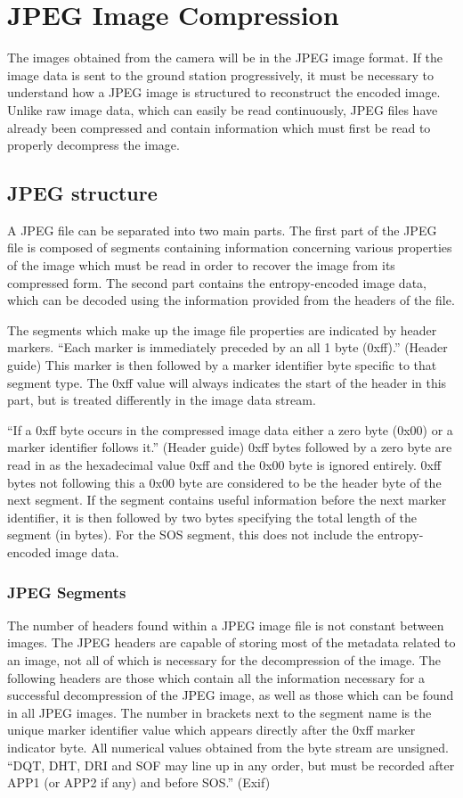 
\section{JPEG Image Compression}
The images obtained from the camera will be in the JPEG image format. 
If the image data is sent to the ground station progressively, 
it must be necessary to understand how a JPEG image is structured to reconstruct the encoded image. 
Unlike raw image data, which can easily be read continuously, 
JPEG files have already been compressed and contain information which must first be read to properly decompress the image.

\subsection{JPEG structure}
A JPEG file can be separated into two main parts. 
The first part of the JPEG file is composed of segments containing information concerning 
various properties of the image which must be read in order to recover the image from its compressed form. 
The second part contains the entropy-encoded image data, which can be decoded using the information provided from the headers of the file.  

The segments which make up the image file properties are indicated by header markers. 
``Each marker is immediately preceded by an all 1 byte (0xff).'' (Header guide) 
This marker is then followed by a marker identifier byte specific to that segment type. 
The 0xff value will always indicates the start of the header in this part, but is treated differently in the image data stream. 

``If a 0xff byte occurs in the compressed image data either a zero byte (0x00) or a marker identifier follows it.'' (Header guide) 
0xff bytes followed by a zero byte are read in as the hexadecimal value 0xff and the 0x00 byte is ignored entirely. 
0xff bytes not following this a 0x00 byte are considered to be the header byte of the next segment. 
If the segment contains useful information before the next marker identifier, it is then followed by two bytes specifying the total length of the segment (in bytes). 
For the SOS segment, this does not include the entropy-encoded image data.

\subsubsection{JPEG Segments}
The number of headers found within a JPEG image file is not constant between images. 
The JPEG headers are capable of storing most of the metadata related to an image, not all of which is necessary for the decompression of the image. 
The following headers are those which contain all the information necessary for 
a successful decompression of the JPEG image, as well as those which can be found in all JPEG images. 
The number in brackets next to the segment name is the unique marker identifier value which appears directly after the 0xff marker indicator byte. 
All numerical values obtained from the byte stream are unsigned. 
``DQT, DHT, DRI and SOF may line up in any order, but must be recorded after APP1 (or APP2 if any) and before SOS.'' (Exif)

